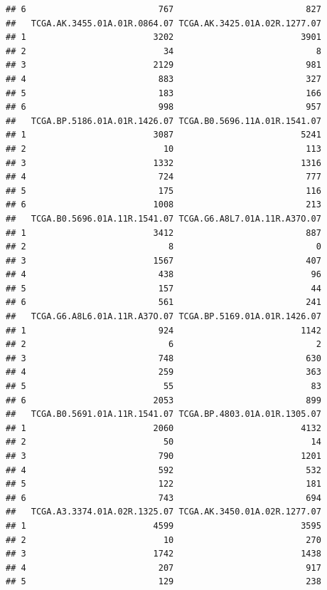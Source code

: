 \documentclass[
]{article}
\begin{document}
\begin{verbatim}
## 6                          767                          827
##   TCGA.AK.3455.01A.01R.0864.07 TCGA.AK.3425.01A.02R.1277.07
## 1                         3202                         3901
## 2                           34                            8
## 3                         2129                          981
## 4                          883                          327
## 5                          183                          166
## 6                          998                          957
##   TCGA.BP.5186.01A.01R.1426.07 TCGA.B0.5696.11A.01R.1541.07
## 1                         3087                         5241
## 2                           10                          113
## 3                         1332                         1316
## 4                          724                          777
## 5                          175                          116
## 6                         1008                          213
##   TCGA.B0.5696.01A.11R.1541.07 TCGA.G6.A8L7.01A.11R.A37O.07
## 1                         3412                          887
## 2                            8                            0
## 3                         1567                          407
## 4                          438                           96
## 5                          157                           44
## 6                          561                          241
##   TCGA.G6.A8L6.01A.11R.A37O.07 TCGA.BP.5169.01A.01R.1426.07
## 1                          924                         1142
## 2                            6                            2
## 3                          748                          630
## 4                          259                          363
## 5                           55                           83
## 6                         2053                          899
##   TCGA.B0.5691.01A.11R.1541.07 TCGA.BP.4803.01A.01R.1305.07
## 1                         2060                         4132
## 2                           50                           14
## 3                          790                         1201
## 4                          592                          532
## 5                          122                          181
## 6                          743                          694
##   TCGA.A3.3374.01A.02R.1325.07 TCGA.AK.3450.01A.02R.1277.07
## 1                         4599                         3595
## 2                           10                          270
## 3                         1742                         1438
## 4                          207                          917
## 5                          129                          238

\end{verbatim}
\end{document}
